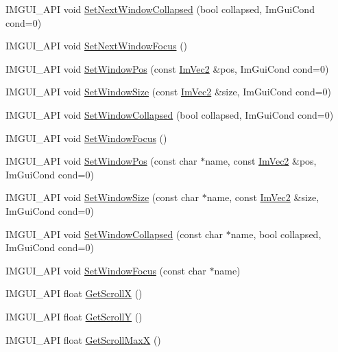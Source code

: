 \begin{DoxyCompactItemize}
\item 
I\+M\+G\+U\+I\+\_\+\+A\+PI void \hyperlink{namespace_im_gui_a3e9380e253a3c49665a404e56950a52a}{Set\+Next\+Window\+Collapsed} (bool collapsed, Im\+Gui\+Cond cond=0)
\item 
I\+M\+G\+U\+I\+\_\+\+A\+PI void \hyperlink{namespace_im_gui_ac2d2b163c95cd8c8391aba85bc50d170}{Set\+Next\+Window\+Focus} ()
\item 
I\+M\+G\+U\+I\+\_\+\+A\+PI void \hyperlink{namespace_im_gui_aaa81e004de4c0a5cedb836e92e8aa0e5}{Set\+Window\+Pos} (const \hyperlink{struct_im_vec2}{Im\+Vec2} \&pos, Im\+Gui\+Cond cond=0)
\item 
I\+M\+G\+U\+I\+\_\+\+A\+PI void \hyperlink{namespace_im_gui_a657c6cc2246485332f608a5204447ea1}{Set\+Window\+Size} (const \hyperlink{struct_im_vec2}{Im\+Vec2} \&size, Im\+Gui\+Cond cond=0)
\item 
I\+M\+G\+U\+I\+\_\+\+A\+PI void \hyperlink{namespace_im_gui_ab5445711a74e0e1a58d1e464cdda252f}{Set\+Window\+Collapsed} (bool collapsed, Im\+Gui\+Cond cond=0)
\item 
I\+M\+G\+U\+I\+\_\+\+A\+PI void \hyperlink{namespace_im_gui_ac71920931ed7b7c8594ee84c6a94e7b8}{Set\+Window\+Focus} ()
\item 
I\+M\+G\+U\+I\+\_\+\+A\+PI void \hyperlink{namespace_im_gui_a32032b56f975bb3145adbe19f38f3b56}{Set\+Window\+Pos} (const char $\ast$name, const \hyperlink{struct_im_vec2}{Im\+Vec2} \&pos, Im\+Gui\+Cond cond=0)
\item 
I\+M\+G\+U\+I\+\_\+\+A\+PI void \hyperlink{namespace_im_gui_a441528b9198d4531e79337121212cd33}{Set\+Window\+Size} (const char $\ast$name, const \hyperlink{struct_im_vec2}{Im\+Vec2} \&size, Im\+Gui\+Cond cond=0)
\item 
I\+M\+G\+U\+I\+\_\+\+A\+PI void \hyperlink{namespace_im_gui_ac349187d6aae141cd3b4476e54bcc338}{Set\+Window\+Collapsed} (const char $\ast$name, bool collapsed, Im\+Gui\+Cond cond=0)
\item 
I\+M\+G\+U\+I\+\_\+\+A\+PI void \hyperlink{namespace_im_gui_aa612adbb975051090898f094a1608f24}{Set\+Window\+Focus} (const char $\ast$name)
\item 
I\+M\+G\+U\+I\+\_\+\+A\+PI float \hyperlink{namespace_im_gui_a6f88335d87da3be81dc6e24cb1812923}{Get\+ScrollX} ()
\item 
I\+M\+G\+U\+I\+\_\+\+A\+PI float \hyperlink{namespace_im_gui_a3c924a2eeb8b2ddfb40ea17be7ea12a6}{Get\+ScrollY} ()
\item 
I\+M\+G\+U\+I\+\_\+\+A\+PI float \hyperlink{namespace_im_gui_af472cb090157c22e65a0aa1662b9f3d0}{Get\+Scroll\+MaxX} ()

\end{DoxyCompactItemize}
